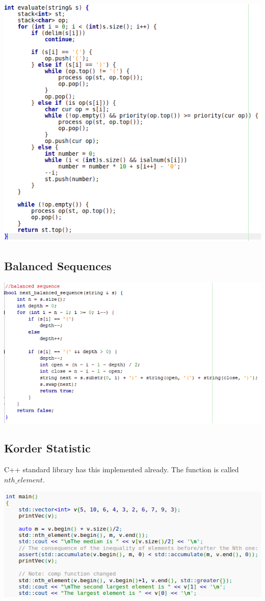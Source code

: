 \documentclass[11pt,twocolumn]{article}
\begin{document}
\includegraphics[scale=0.4]{parseb}

\subsection{Balanced Sequences}


\includegraphics[scale=0.6]{balanced}


\subsection{Korder Statistic}
C++ standard library has this implemented already. The function is called $nth\_element$.

\includegraphics[scale=0.4]{nthelement}
\end{document}
